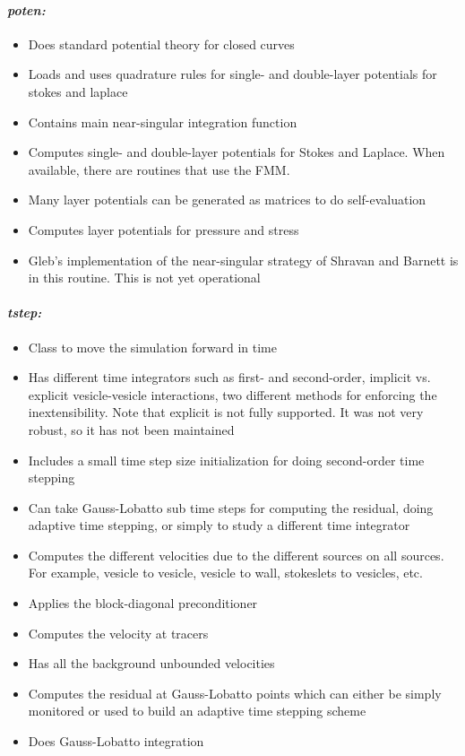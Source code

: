 \documentclass[12pt]{article}
\begin{document}
\paragraph{\emph{poten:}}
\begin{itemize}
\item Does standard potential theory for closed curves
\item Loads and uses quadrature rules for single- and double-layer
potentials for stokes and laplace
\item Contains main near-singular integration function
\item Computes single- and double-layer potentials for Stokes and
Laplace.  When available, there are routines that use the FMM.
\item Many layer potentials can be generated as matrices to do
self-evaluation
\item Computes layer potentials for pressure and stress
\item Gleb's implementation of the near-singular strategy of Shravan and
Barnett is in this routine.  This is not yet operational
\end{itemize}

\paragraph{\emph{tstep:}}
\begin{itemize}
\item Class to move the simulation forward in time
\item Has different time integrators such as first- and second-order,
implicit vs. explicit vesicle-vesicle interactions, two different
methods for enforcing the inextensibility.  Note that explicit is not
fully supported.  It was not very robust, so it has not been maintained
\item Includes a small time step size initialization for doing
second-order time stepping
\item Can take Gauss-Lobatto sub time steps for computing the residual,
doing adaptive time stepping, or simply to study a different time
integrator
\item Computes the different velocities due to the different sources on
all sources.  For example, vesicle to vesicle, vesicle to wall, stokeslets to
vesicles, etc.
\item Applies the block-diagonal preconditioner
\item Computes the velocity at tracers
\item Has all the background unbounded velocities
\item Computes the residual at Gauss-Lobatto points which can either be
simply monitored or used to build an adaptive time stepping scheme
\item Does Gauss-Lobatto integration
\end{itemize}
\end{document}
